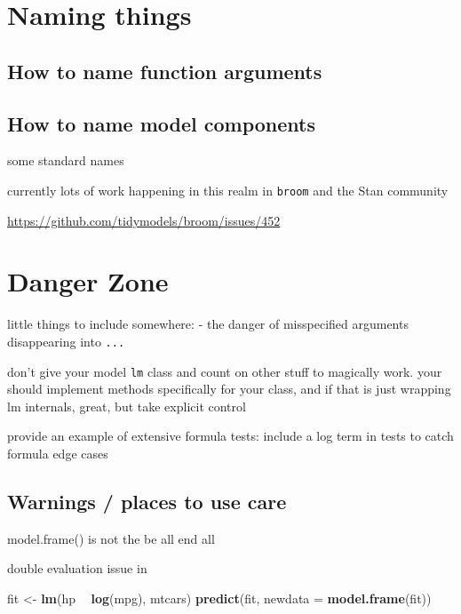 \documentclass[]{book}
\newenvironment{Shaded}{\begin{snugshade}}{\end{snugshade}}
\newcommand{\KeywordTok}[1]{\textcolor[rgb]{0.13,0.29,0.53}{\textbf{#1}}}
\newcommand{\DataTypeTok}[1]{\textcolor[rgb]{0.13,0.29,0.53}{#1}}
\newcommand{\StringTok}[1]{\textcolor[rgb]{0.31,0.60,0.02}{#1}}
\newcommand{\OperatorTok}[1]{\textcolor[rgb]{0.81,0.36,0.00}{\textbf{#1}}}
\newcommand{\NormalTok}[1]{#1}
\theoremstyle{definition}
\theoremstyle{definition}
\theoremstyle{definition}
\theoremstyle{remark}
\begin{document}
\chapter{Naming things}\label{naming-things}

\section{How to name function
arguments}\label{how-to-name-function-arguments}

\section{How to name model
components}\label{how-to-name-model-components}

some standard names

currently lots of work happening in this realm in \texttt{broom} and the
Stan community

\url{https://github.com/tidymodels/broom/issues/452}

\chapter{Danger Zone}\label{danger-zone}

little things to include somewhere: - the danger of misspecified
arguments disappearing into \texttt{...}

don't give your model \texttt{lm} class and count on other stuff to
magically work. your should implement methods specifically for your
class, and if that is just wrapping lm internals, great, but take
explicit control

provide an example of extensive formula tests: include a log term in
tests to catch formula edge cases

\section{Warnings / places to use
care}\label{warnings-places-to-use-care}

model.frame() is not the be all end all

double evaluation issue in

\begin{Shaded}
\begin{Highlighting}[]
\NormalTok{fit <-}\StringTok{ }\KeywordTok{lm}\NormalTok{(hp }\OperatorTok{~}\StringTok{ }\KeywordTok{log}\NormalTok{(mpg), mtcars)}
\KeywordTok{predict}\NormalTok{(fit, }\DataTypeTok{newdata =} \KeywordTok{model.frame}\NormalTok{(fit))}
\end{Highlighting}
\end{Shaded}
\end{document}
